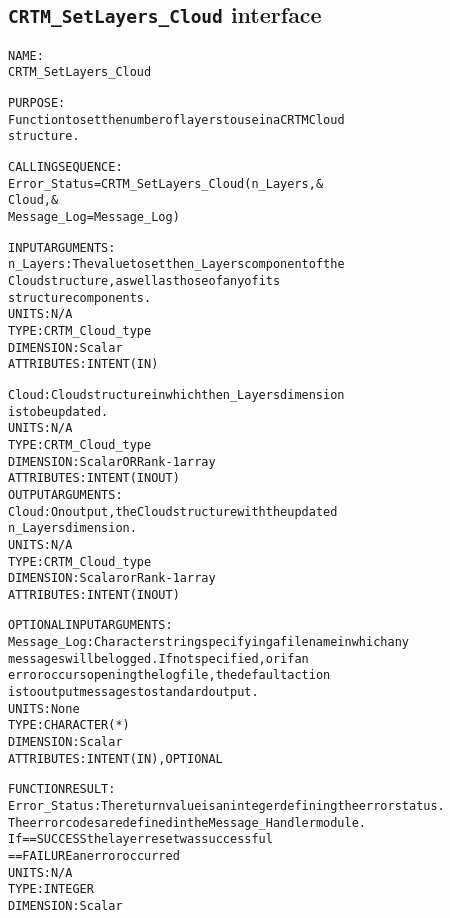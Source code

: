 \subsection{\texttt{CRTM\_SetLayers\_Cloud} interface}
  \label{sec:CRTM_SetLayers_Cloud_interface}
  \begin{alltt}
 
  NAME:
        CRTM_SetLayers_Cloud
  
  PURPOSE:
        Function to set the number of layers to use in a CRTM Cloud
        structure.
 
  CALLING SEQUENCE:
        Error_Status = CRTM_SetLayers_Cloud( n_Layers               , &
                                             Cloud                  , &
                                             Message_Log=Message_Log  )
 
  INPUT ARGUMENTS:
        n_Layers:     The value to set the n_Layers component of the 
                      Cloud structure, as well as those of any of its
                      structure components.
                      UNITS:      N/A
                      TYPE:       CRTM_Cloud_type
                      DIMENSION:  Scalar
                      ATTRIBUTES: INTENT(IN)
 
        Cloud:        Cloud structure in which the n_Layers dimension
                      is to be updated.
                      UNITS:      N/A
                      TYPE:       CRTM_Cloud_type
                      DIMENSION:  Scalar OR Rank-1 array
                      ATTRIBUTES: INTENT(IN OUT)
  OUTPUT ARGUMENTS:
        Cloud:        On output, the Cloud structure with the updated
                      n_Layers dimension.
                      UNITS:      N/A
                      TYPE:       CRTM_Cloud_type
                      DIMENSION:  Scalar or Rank-1 array
                      ATTRIBUTES: INTENT(IN OUT)
 
  OPTIONAL INPUT ARGUMENTS:
        Message_Log:  Character string specifying a filename in which any
                      messages will be logged. If not specified, or if an
                      error occurs opening the log file, the default action
                      is to output messages to standard output.
                      UNITS:      None
                      TYPE:       CHARACTER(*)
                      DIMENSION:  Scalar
                      ATTRIBUTES: INTENT(IN), OPTIONAL
 
  FUNCTION RESULT:
        Error_Status: The return value is an integer defining the error status.
                      The error codes are defined in the Message_Handler module.
                      If == SUCCESS the layer reset was successful
                         == FAILURE an error occurred
                      UNITS:      N/A
                      TYPE:       INTEGER
                      DIMENSION:  Scalar
 

\end{alltt}
